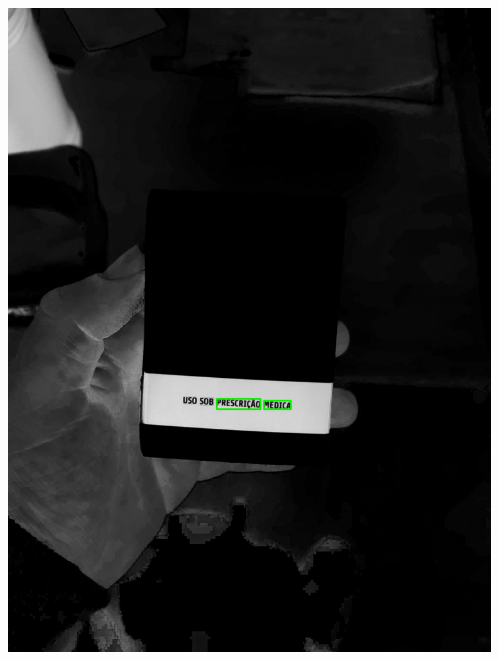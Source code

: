 \begin{frame}
\begin{columns}
\begin{column}{0.24\textwidth}
			\includegraphics[height=0.35\textheight]{../pictures/tysabri_cmyk_m_only_boxes.jpg}
		\end{column}
		\begin{column}{0.24\textwidth}\centering

\end{column}
\end{columns}
\end{frame}
